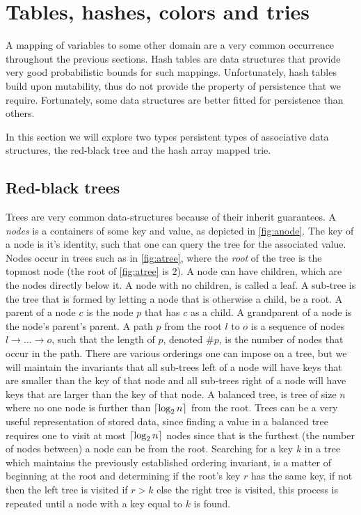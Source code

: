 \section{Tables, hashes, colors and tries}
A mapping of variables to some other domain are a very common occurrence throughout the previous sections.
Hash tables are data structures that provide very good probabilistic bounds for such mappings.
Unfortunately, hash tables build upon mutability, thus do not provide the property of persistence that we require.
Fortunately, some data structures are better fitted for persistence than others.

In this section we will explore two types persistent types of associative data structures, the red-black tree and the hash array mapped trie.

\subsection{Red-black trees}\label{sub:rb}
Trees are very common data-structures because of their inherit guarantees.
A \textit{nodes} is a containers of some key and value, as depicted in \autoref{fig:anode}.
The key of a node is it's identity, such that one can query the tree for the associated value.
Nodes occur in trees such as in \autoref{fig:atree}, where the \textit{root} of the tree is the topmost node (the root of \autoref{fig:atree} is $2$).
A node can have children, which are the nodes directly below it.
A node with no children, is called a leaf.
A sub-tree is the tree that is formed by letting a node that is otherwise a child, be a root.
A parent of a node $c$ is the node $p$ that has $c$ as a child.
A grandparent of a node is the node's parent's parent.
A path $p$ from the root $l$ to $o$ is a sequence of nodes $l \rightarrow \dots \rightarrow o$, such that the length of $p$, denoted $\#p$, is the number of nodes that occur in the path.
There are various orderings one can impose on a tree, but we will maintain the invariants that all sub-trees left of a node will have keys that are smaller than the key of that node and all sub-trees right of a node will have keys that are larger than the key of that node.
A balanced tree, is tree of size $n$ where no one node is further than $\lceil\log_2 n\rceil$ from the root.
Trees can be a very useful representation of stored data, since finding a value in a balanced tree requires one to visit at most $\lceil\log_2 n\rceil$ nodes since that is the furthest (the number of nodes between) a node can be from the root.
Searching for a key $k$ in a tree which maintains the previously established ordering invariant, is a matter of beginning at the root and determining if the root's key $r$ has the same key, if not then the left tree is visited if $r > k$ else the right tree is visited, this process is repeated until a node with a key equal to $k$ is found.
